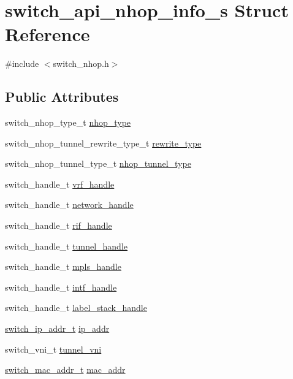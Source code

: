\hypertarget{structswitch__api__nhop__info__s}{\section{switch\+\_\+api\+\_\+nhop\+\_\+info\+\_\+s Struct Reference}
\label{structswitch__api__nhop__info__s}
}


{\ttfamily \#include $<$switch\+\_\+nhop.\+h$>$}

\subsection*{Public Attributes}
\begin{DoxyCompactItemize}
\item 
switch\+\_\+nhop\+\_\+type\+\_\+t \hyperlink{structswitch__api__nhop__info__s_ac0e8065a38b4877ea1e7549db444abe1}{nhop\+\_\+type}
\item 
switch\+\_\+nhop\+\_\+tunnel\+\_\+rewrite\+\_\+type\+\_\+t \hyperlink{structswitch__api__nhop__info__s_a241421289b54d380336f4f1e5b97d32c}{rewrite\+\_\+type}
\item 
switch\+\_\+nhop\+\_\+tunnel\+\_\+type\+\_\+t \hyperlink{structswitch__api__nhop__info__s_ac62ded2a49a21c23bac8c0dd876e13a4}{nhop\+\_\+tunnel\+\_\+type}
\item 
switch\+\_\+handle\+\_\+t \hyperlink{structswitch__api__nhop__info__s_adc3d40c153b06734b7380c240b88bedd}{vrf\+\_\+handle}
\item 
switch\+\_\+handle\+\_\+t \hyperlink{structswitch__api__nhop__info__s_aef8cdac12a70bd9ff6ee3cfa837ae48d}{network\+\_\+handle}
\item 
switch\+\_\+handle\+\_\+t \hyperlink{structswitch__api__nhop__info__s_a0f870d6d253058f7338d031300b4140a}{rif\+\_\+handle}
\item 
switch\+\_\+handle\+\_\+t \hyperlink{structswitch__api__nhop__info__s_a53aa868d98635cc58ec012a97c26b07f}{tunnel\+\_\+handle}
\item 
switch\+\_\+handle\+\_\+t \hyperlink{structswitch__api__nhop__info__s_a19ad79761f0abeb8a535ce77b94a2743}{mpls\+\_\+handle}
\item 
switch\+\_\+handle\+\_\+t \hyperlink{structswitch__api__nhop__info__s_ab2216011f321eeb1bd4c37170e0a1a9e}{intf\+\_\+handle}
\item 
switch\+\_\+handle\+\_\+t \hyperlink{structswitch__api__nhop__info__s_a52ff3a394856378ca29fd3ebcea2fcbf}{label\+\_\+stack\+\_\+handle}
\item 
\hyperlink{structswitch__ip__addr__s}{switch\+\_\+ip\+\_\+addr\+\_\+t} \hyperlink{structswitch__api__nhop__info__s_a40056a7bb1a4659b5f9a6b0c19e7fbd9}{ip\+\_\+addr}
\item 
switch\+\_\+vni\+\_\+t \hyperlink{structswitch__api__nhop__info__s_a1038ee9d9d4c4e1ba6dac9410abda7f6}{tunnel\+\_\+vni}
\item 
\hyperlink{structswitch__mac__addr__s}{switch\+\_\+mac\+\_\+addr\+\_\+t} \hyperlink{structswitch__api__nhop__info__s_a677e98056efa96a4b6a9a3b243337473}{mac\+\_\+addr}
\end{DoxyCompactItemize}


